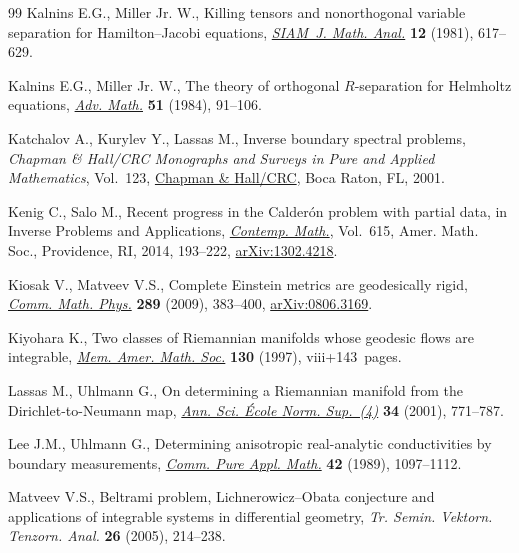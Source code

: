 \documentclass[pdftex]{sigma}
\numberwithin{equation}{section}
\begin{document}
\begin{thebibliography}{99}
Kalnins E.G., Miller Jr. W., Killing tensors and nonorthogonal variable
 separation for {H}amilton--{J}acobi equations, \href{https://doi.org/10.1137/0512054}{\textit{SIAM~J. Math. Anal.}}
 \textbf{12} (1981), 617--629.

Kalnins E.G., Miller Jr. W., The theory of orthogonal {$R$}-separation for
 {H}elmholtz equations, \href{https://doi.org/10.1016/0001-8708(84)90004-5}{\textit{Adv. Math.}} \textbf{51} (1984), 91--106.

Katchalov A., Kurylev Y., Lassas M., Inverse boundary spectral problems,
\textit{Chapman \& Hall/CRC Monographs and Surveys in Pure and Applied
 Mathematics}, Vol.~123, \href{https://doi.org/10.1201/9781420036220}{Chapman \& Hall/CRC}, Boca Raton, FL, 2001.

Kenig C., Salo M., Recent progress in the {C}alder\'{o}n problem with partial
 data, in Inverse Problems and Applications, \href{https://doi.org/10.1090/conm/615/12245}{\textit{Contemp. Math.}}, Vol.~615, Amer. Math. Soc., Providence, RI, 2014, 193--222, \href{https://arxiv.org/abs/1302.4218}{arXiv:1302.4218}.

Kiosak V., Matveev V.S., Complete {E}instein metrics are geodesically rigid,
 \href{https://doi.org/10.1007/s00220-008-0719-7}{\textit{Comm. Math. Phys.}} \textbf{289} (2009), 383--400, \href{https://arxiv.org/abs/0806.3169}{arXiv:0806.3169}.

Kiyohara K., Two classes of {R}iemannian manifolds whose geodesic flows are
 integrable, \href{https://doi.org/10.1090/memo/0619}{\textit{Mem. Amer. Math. Soc.}} \textbf{130} (1997),
 viii+143~pages.

Lassas M., Uhlmann G., On determining a {R}iemannian manifold from the
 {D}irichlet-to-{N}eumann map, \href{https://doi.org/10.1016/S0012-9593(01)01076-X}{\textit{Ann. Sci. \'Ecole Norm. Sup.~(4)}}
 \textbf{34} (2001), 771--787.

Lee J.M., Uhlmann G., Determining anisotropic real-analytic conductivities by
 boundary measurements, \href{https://doi.org/10.1002/cpa.3160420804}{\textit{Comm. Pure Appl. Math.}} \textbf{42} (1989),
 1097--1112.

Matveev V.S., Beltrami problem, {L}ichnerowicz--{O}bata conjecture and
 applications of integrable systems in differential geometry, \textit{Tr.
 Semin. Vektorn. Tenzorn. Anal.} \textbf{26} (2005), 214--238.


\end{thebibliography}
\end{document}

